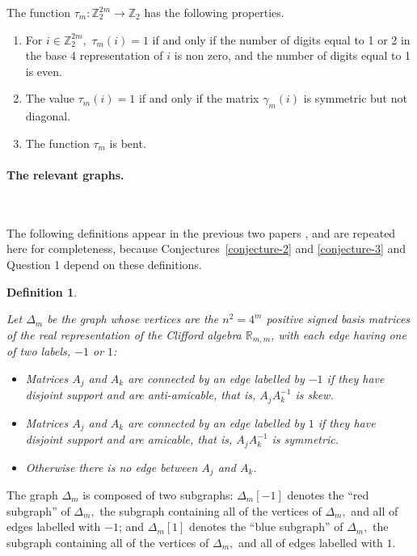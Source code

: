 \documentclass[12pt,a4paper]{article}
\newcommand{\mb}[1]{\mathbb{#1}}
\newcommand{\R}{\mb{R}}
\newcommand{\Z}{\mb{Z}}
\newcommand{\To}{\rightarrow}
\newtheorem{Definition}{Definition}
\begin{document}
The function $\tau_m : \Z_2^{2 m} \To \Z_2$ has the following properties.
\begin{enumerate}
 \item 
For $i \in \Z_2^{2m},$ $\tau_m(i) = 1$ if and only if the number of digits equal to 1 or 2 in the base 4
representation of $i$ is non zero, and the number of digits equal to 1 is even.
 \item 
The value $\tau_m(i) = 1$ if and only if the matrix $\gamma_m(i)$ is symmetric but not diagonal.
 \item 
The function $\tau_m$ is bent.
\end{enumerate}

\paragraph*{The relevant graphs.}
\label{sec-Graphs}

~

The following definitions appear in the previous two papers \cite{Leo14Constructions,Leo15Twin},
and are repeated here for completeness, because Conjectures~\ref{conjecture-2} and \ref{conjecture-3} and Question 1 depend on these definitions.

\begin{Definition}\label{definition-delta}
\cite[p. 225]{Leo14Constructions}

Let $\varDelta_m$ be the graph whose vertices are the $n^2=4^m$ 
positive signed basis matrices of the real representation
of the Clifford algebra $\R_{m,m}$,
with each edge having one of two labels, $-1$ or $1$:
\begin{itemize}
\item 
Matrices $A_j$ and $A_k$ are connected by an edge labelled by $-1$ if they have disjoint support and are anti-amicable,
that is, $A_j A_k^{-1}$ is skew.
\item 
Matrices $A_j$ and $A_k$ are connected by an edge labelled by $1$ if they have disjoint support and are amicable,
that is, $A_j A_k^{-1}$ is symmetric.
\item 
Otherwise there is no edge between $A_j$ and $A_k$.
\end{itemize}
\end{Definition}

The graph $\varDelta_m$ is composed
of two subgraphs:
$\varDelta_m[-1]$ denotes the ``red subgraph'' of $\varDelta_m,$
the subgraph containing all of the vertices of $\varDelta_m,$ and all of edges labelled with $-1$;
and $\varDelta_m[1]$ denotes the ``blue subgraph'' of $\varDelta_m,$
the subgraph containing all of the vertices of $\varDelta_m,$ and all of edges labelled with $1$.
\end{document}
